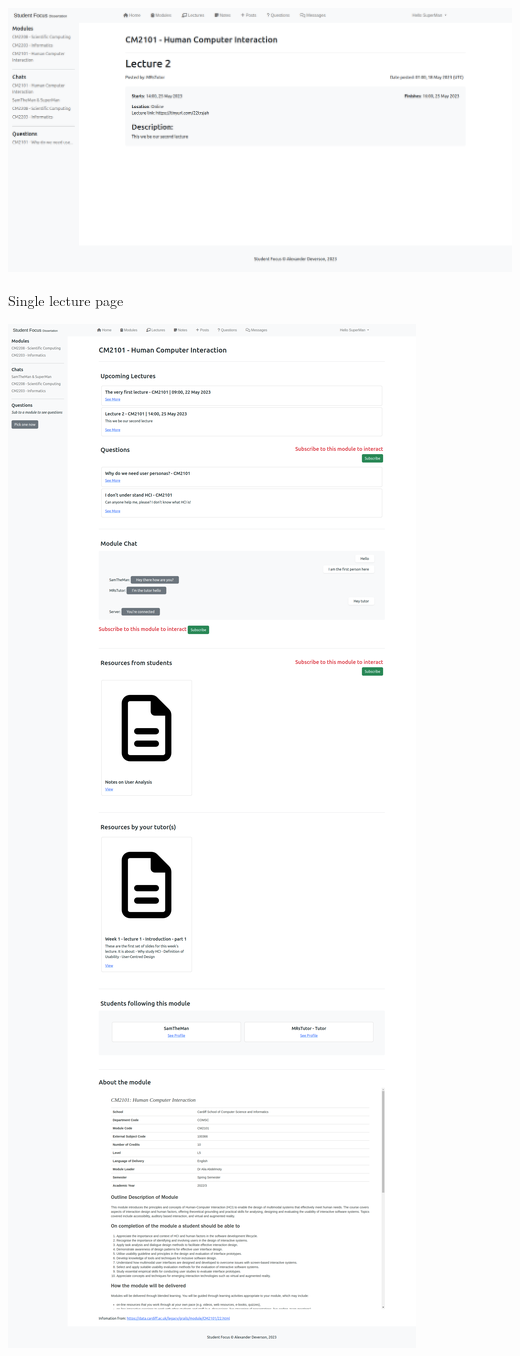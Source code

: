 \includegraphics[scale=0.20]{images/application/45 - lecture_single.png}

Single lecture page

\includegraphics[scale=0.12]{images/application/46 - non_subed_module.png}

